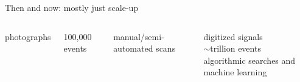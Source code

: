 \documentclass[aspectratio=169]{beamer}
\begin{document}
\begin{frame}{Then and now: mostly just scale-up}
\begin{columns}
\begin{center}
\begin{columns}
\centering
photographs

\vspace{0.5 cm}
100,000 events

\vspace{0.5 cm}
manual/semi-automated scans

\centering
digitized signals \\

\vspace{0.5 cm}
$\sim$trillion events \\

\vspace{0.5 cm}
algorithmic searches and machine learning
\end{columns}
\end{center}


\end{columns}
\end{frame}
\end{document}

